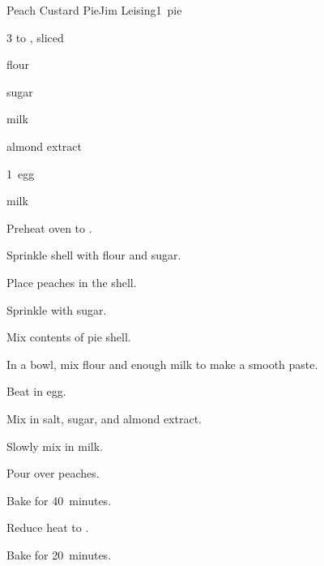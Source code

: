 \begin{recipe}{Peach Custard Pie}{Jim Leising}{1~pie}

\begin{ingredients}
\item 3 to  , sliced
\item flour
\item sugar
\item milk
\item \tp{\half} almond extract
\item 1~egg
\item \C{\half} milk
\end{ingredients}

\begin{directions}
\item Preheat oven to .
\item Sprinkle shell with flour and sugar.
\item Place peaches in the shell.
\item Sprinkle with \C{\threequarter} sugar.
\item Mix contents of pie shell.
\item In a bowl, mix  flour and enough milk to make a smooth paste.
\item Beat in egg.
\item Mix in salt,  sugar, and almond extract.
\item Slowly mix in milk.
\item Pour over peaches.
\item Bake for 40~minutes.
\item Reduce heat to .
\item Bake for 20~minutes.
\end{directions}

\end{recipe}
